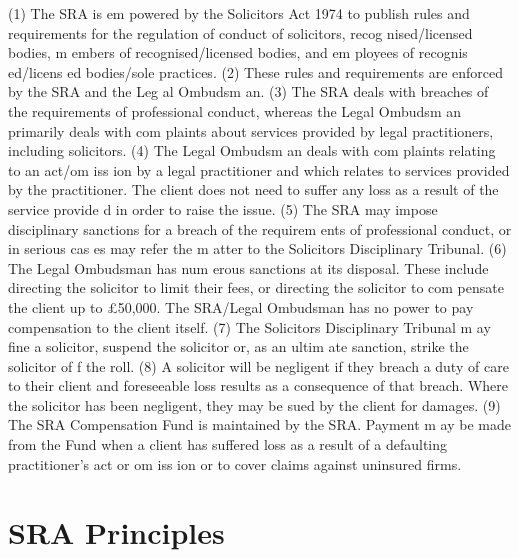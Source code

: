 \documentclass[
]{article}
\newenvironment{Shaded}{}{}
\newcommand{\NormalTok}[1]{#1}
\begin{document}
\begin{Shaded}
\begin{Highlighting}[]
\NormalTok{(1) The SRA is em powered by the Solicitors Act 1974 to publish rules and requirements  }
\NormalTok{for the regulation of conduct of solicitors, recog nised/licensed bodies, m embers of recognised/licensed bodies, and em ployees of recognis ed/licens ed bodies/sole  }
\NormalTok{practices.  }
\NormalTok{(2) These rules and requirements are enforced by the SRA and the Leg al Ombudsm an.  }
\NormalTok{(3) The SRA deals with breaches of the requirements of professional conduct, whereas the Legal Ombudsm an primarily deals with com plaints about services provided by legal practitioners, including solicitors.}
\NormalTok{(4) The Legal Ombudsm an deals with com plaints relating to an act/om iss ion by a legal practitioner and which relates to services provided by the practitioner. The client does not need to suffer any loss as a result of the service provide d in order to raise the issue.  }
\NormalTok{(5) The SRA may impose disciplinary sanctions for a breach of the requirem ents of  }
\NormalTok{professional conduct, or in serious cas es may refer the m atter to the Solicitors  }
\NormalTok{Disciplinary Tribunal.  }
\NormalTok{(6) The Legal Ombudsman has num erous sanctions at its disposal. These include  }
\NormalTok{directing the solicitor to limit their fees, or directing the solicitor to com pensate the client up to £50,000. The SRA/Legal Ombudsman has no power to pay  }
\NormalTok{compensation to the client itself.  }
\NormalTok{(7) The Solicitors Disciplinary Tribunal m ay fine a solicitor, suspend the solicitor or, as an ultim ate sanction, strike the solicitor of f the roll.  }
\NormalTok{(8) A solicitor will be negligent if they breach a duty of care to their client and  }
\NormalTok{foreseeable loss results as a consequence of that breach. Where the solicitor has  }
\NormalTok{been negligent, they may be sued by the client for damages.  }
\NormalTok{(9) The SRA Compensation Fund is maintained by the SRA. Payment m ay be made from  }
\NormalTok{the Fund when a client has suffered loss as a result of a defaulting practitioner’s act or om iss ion or to cover claims against uninsured firms.}
\end{Highlighting}
\end{Shaded}

\hypertarget{sra-principles}{%
\section{SRA Principles}\label{sra-principles}}
\end{document}
